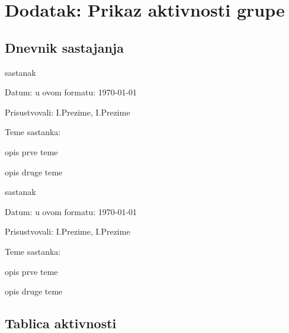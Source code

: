 \chapter*{Dodatak: Prikaz aktivnosti grupe}
		
		\section*{Dnevnik sastajanja}
		
		\begin{packed_enum}
			\item  sastanak
			
			\item[] \begin{packed_item}
				\item Datum: u ovom formatu: \today
				\item Prisustvovali: I.Prezime, I.Prezime
				\item Teme sastanka:
				\begin{packed_item}
					\item  opis prve teme
					\item  opis druge teme
				\end{packed_item}
			\end{packed_item}
			
			\item  sastanak
			\item[] \begin{packed_item}
				\item Datum: u ovom formatu: \today
				\item Prisustvovali: I.Prezime, I.Prezime
				\item Teme sastanka:
				\begin{packed_item}
					\item  opis prve teme
					\item  opis druge teme
				\end{packed_item}
			\end{packed_item}
			
			
		\end{packed_enum}
		
		\eject
		\section*{Tablica aktivnosti}
			
